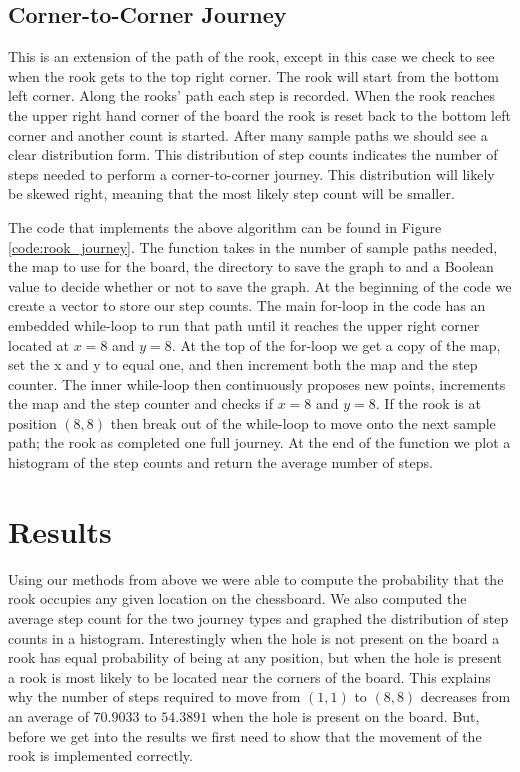 \documentclass{amsart}
\numberwithin{equation}{section}
\begin{document}
\subsection{Corner-to-Corner Journey}
This is an extension of the path of the rook, except in this case we check to see when the rook gets to the top right corner. The rook will start from the bottom left corner. Along the rooks' path each step is recorded. When the rook reaches the upper right hand corner of the board the rook is reset back to the bottom left corner and another count is started. After many sample paths we should see a clear distribution form. This distribution of step counts indicates the number of steps needed to perform a corner-to-corner journey. This distribution will likely be skewed right, meaning that the most likely step count will be smaller. \par
The code that implements the above algorithm can be found in Figure \ref{code:rook_journey}. The function takes in the number of sample paths needed, the map to use for the board, the directory to save the graph to and a Boolean value to decide whether or not to save the graph. At the beginning of the code we create a vector to store our step counts. The main for-loop in the code has an embedded while-loop to run that path until it reaches the upper right corner located at $x=8$ and $y=8$. At the top of the for-loop we get a copy of the map, set the x and y to equal one, and then increment both the map and the step counter. The inner while-loop then continuously proposes new points, increments the map and the step counter and checks if $x=8$ and $y=8$. If the rook is at position $(8,8)$ then break out of the while-loop to move onto the next sample path; the rook as completed one full journey. At the end of the function we plot a histogram of the step counts and return the average number of steps.


\section{Results}
Using our methods from above we were able to compute the probability that the rook occupies any given location on the chessboard. We also computed the average step count for the two journey types and graphed the distribution of step counts in a histogram.  Interestingly when the hole is not present on the board a rook has equal probability of being at any position, but when the hole is present a rook is most likely to be located near the corners of the board. This explains why the number of steps required to move from $(1,1)$ to $(8,8)$ decreases from an average of $70.9033$ to $54.3891$ when the hole is present on the board. But, before we get into the results we first need to show that the movement of the rook is implemented correctly.
\end{document}
